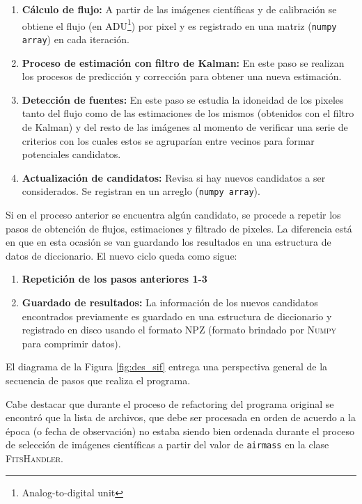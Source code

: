 \begin{enumerate}
\item \textbf{C\'alculo de flujo:} A partir de las im\'agenes cient\'ificas y de calibraci\'on se obtiene el flujo (en ADU\footnote{Analog-to-digital unit}) por pixel y es registrado en una matriz (\texttt{numpy array}) en cada iteraci\'on. 
\item \textbf{Proceso de estimaci\'on con filtro de Kalman:} En este paso se realizan los procesos de predicci\'on y correcci\'on para obtener una nueva estimaci\'on. 
\item \textbf{Detecci\'on de fuentes:} En este paso se estudia la idoneidad de los pixeles tanto del flujo como de las estimaciones de los mismos (obtenidos con el filtro de Kalman) y del resto de las im\'agenes al momento de verificar una serie de criterios con los cuales estos se agrupar\'ian entre vecinos para formar potenciales candidatos.  
\item \textbf{Actualizaci\'on de candidatos:} Revisa si hay nuevos candidatos a ser considerados. Se registran en un arreglo (\texttt{numpy array}).
\end{enumerate}

Si en el proceso anterior se encuentra alg\'un candidato, se procede a repetir los pasos de obtenci\'on de flujos, estimaciones y filtrado de pixeles. La diferencia est\'a en que en esta ocasi\'on se van guardando los resultados en una estructura de datos de diccionario. El nuevo ciclo queda como sigue:

\begin{enumerate}

\item \textbf{Repetici\'on de los pasos anteriores 1-3}
\item \textbf{Guardado de resultados:} La informaci\'on de los nuevos candidatos encontrados previamente es guardado en una estructura de diccionario y registrado en disco usando el formato NPZ (formato brindado por \textsc{Numpy} para comprimir datos).
\end{enumerate}


El diagrama de la Figura \ref{fig:des_sif} entrega una perspectiva general de la secuencia de pasos que realiza el programa.
\bigskip

Cabe destacar que durante el proceso de refactoring del programa original se encontr\'o que la lista de archivos, que debe ser procesada en orden de acuerdo a la \'epoca (o fecha de observaci\'on) no estaba siendo bien ordenada durante el proceso de selecci\'on de im\'agenes cient\'ificas a partir del valor de \texttt{airmass} en la clase \textsc{FitsHandler}.
\bigskip


